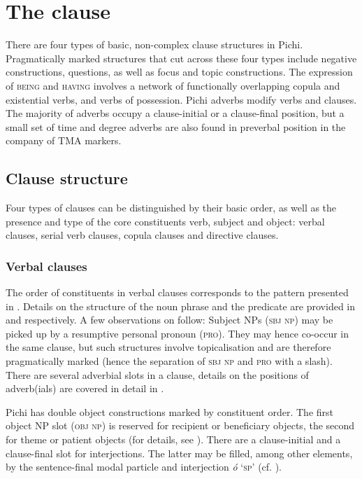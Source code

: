 \chapter{The clause}

There are four types of basic, non-complex clause structures in Pichi. Pragmatically marked structures that cut across these four types include negative constructions, questions, as well as focus and topic constructions. The expression of \textsc{being} and \textsc{having} involves a network of functionally overlapping copula and existential verbs, and verbs of possession. Pichi adverbs modify verbs and clauses. The majority of adverbs occupy a clause-initial or a clause-final position, but a small set of time and degree adverbs are also found in preverbal position in the company of TMA markers.

\section{Clause structure}\label{sec:7.1}

Four types of clauses can be distinguished by their basic order, as well as the presence and type of the core constituents verb, subject and object: verbal clauses, serial verb clauses, copula clauses and directive clauses. 

\subsection{Verbal clauses}\label{sec:7.1.1}

The order of constituents in verbal clauses corresponds to the pattern presented in . Details on the structure of the noun phrase and the predicate are provided in  and  respectively. A few observations on  follow: Subject NPs (\textsc{sbj} \textsc{np}) may be picked up by a resumptive personal pronoun (\textsc{pro}). They may hence co-occur in the same clause, but such structures involve topicalisation and are therefore pragmatically marked (hence the separation of \textsc{sbj} \textsc{np} and \textsc{pro} with a slash). There are several adverbial slots in a clause, details on the positions of adverb(ials) are covered in detail in . 


Pichi has double object constructions marked by constituent order. The first object NP slot (\textsc{obj} \textsc{np}) is reserved for recipient or beneficiary objects, the second for theme or patient objects (for details, see ). There are a clause-initial and a clause-final slot for interjections. The latter may be filled, among other elements, by the sentence-final modal particle and interjection \textit{ó} \textsc{‘sp’} (cf. ).


